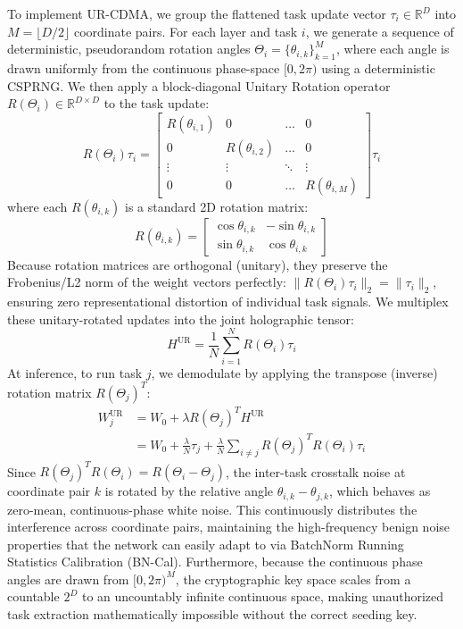 \documentclass{article}
\begin{document}
To implement UR-CDMA, we group the flattened task update vector $\tau_i \in \mathbb{R}^D$ into $M = \lfloor D/2 \rfloor$ coordinate pairs. For each layer and task $i$, we generate a sequence of deterministic, pseudorandom rotation angles $\Theta_i = \{\theta_{i, k}\}_{k=1}^M$, where each angle is drawn uniformly from the continuous phase-space $[0, 2\pi)$ using a deterministic CSPRNG. We then apply a block-diagonal Unitary Rotation operator $R(\Theta_i) \in \mathbb{R}^{D \times D}$ to the task update:
\begin{equation}
    R(\Theta_i) \tau_i = \begin{bmatrix}
        R(\theta_{i, 1}) & 0 & \dots & 0 \\
        0 & R(\theta_{i, 2}) & \dots & 0 \\
        \vdots & \vdots & \ddots & \vdots \\
        0 & 0 & \dots & R(\theta_{i, M})
    \end{bmatrix} \tau_i
\end{equation}
where each $R(\theta_{i, k})$ is a standard 2D rotation matrix:
\begin{equation}
    R(\theta_{i, k}) = \begin{bmatrix}
        \cos \theta_{i, k} & -\sin \theta_{i, k} \\
        \sin \theta_{i, k} & \cos \theta_{i, k}
    \end{bmatrix}
\end{equation}
Because rotation matrices are orthogonal (unitary), they preserve the Frobenius/L2 norm of the weight vectors perfectly: $\|R(\Theta_i) \tau_i\|_2 = \|\tau_i\|_2$, ensuring zero representational distortion of individual task signals. We multiplex these unitary-rotated updates into the joint holographic tensor:
\begin{equation}
    H^{\text{UR}} = \frac{1}{N} \sum_{i=1}^N R(\Theta_i) \tau_i
\end{equation}
At inference, to run task $j$, we demodulate by applying the transpose (inverse) rotation matrix $R(\Theta_j)^T$:
\begin{equation}
\begin{split}
    W_j^{\text{UR}} &= W_0 + \lambda R(\Theta_j)^T H^{\text{UR}} \\
    &= W_0 + \frac{\lambda}{N} \tau_j + \frac{\lambda}{N} \sum_{i \neq j} R(\Theta_j)^T R(\Theta_i) \tau_i
\end{split}
\end{equation}
Since $R(\Theta_j)^T R(\Theta_i) = R(\Theta_i - \Theta_j)$, the inter-task crosstalk noise at coordinate pair $k$ is rotated by the relative angle $\theta_{i, k} - \theta_{j, k}$, which behaves as zero-mean, continuous-phase white noise. This continuously distributes the interference across coordinate pairs, maintaining the high-frequency benign noise properties that the network can easily adapt to via BatchNorm Running Statistics Calibration (BN-Cal). Furthermore, because the continuous phase angles are drawn from $[0, 2\pi)^M$, the cryptographic key space scales from a countable $2^D$ to an uncountably infinite continuous space, making unauthorized task extraction mathematically impossible without the correct seeding key.
\end{document}

